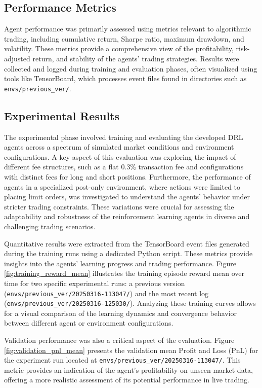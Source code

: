\documentclass{IEEEtran}
\begin{document}
\subsection{Performance Metrics}
Agent performance was primarily assessed using metrics relevant to algorithmic trading, including cumulative return, Sharpe ratio, maximum drawdown, and volatility. These metrics provide a comprehensive view of the profitability, risk-adjusted return, and stability of the agents' trading strategies. Results were collected and logged during training and evaluation phases, often visualized using tools like TensorBoard, which processes event files found in directories such as \texttt{envs/previous\_ver/}.

\subsection{Experimental Results}
The experimental phase involved training and evaluating the developed DRL agents across a spectrum of simulated market conditions and environment configurations. A key aspect of this evaluation was exploring the impact of different fee structures, such as a flat 0.3\% transaction fee and configurations with distinct fees for long and short positions. Furthermore, the performance of agents in a specialized post-only environment, where actions were limited to placing limit orders, was investigated to understand the agents' behavior under stricter trading constraints. These variations were crucial for assessing the adaptability and robustness of the reinforcement learning agents in diverse and challenging trading scenarios.

Quantitative results were extracted from the TensorBoard event files generated during the training runs using a dedicated Python script. These metrics provide insights into the agents' learning progress and trading performance. Figure \ref{fig:training_reward_mean} illustrates the training episode reward mean over time for two specific experimental runs: a previous version (\texttt{envs/previous\_ver/20250316-113047/}) and the most recent log (\texttt{envs/previous\_ver/20250316-125030/}). Analyzing these training curves allows for a visual comparison of the learning dynamics and convergence behavior between different agent or environment configurations.

Validation performance was also a critical aspect of the evaluation. Figure \ref{fig:validation_pnl_mean} presents the validation mean Profit and Loss (PnL) for the experiment run located at \texttt{envs/previous\_ver/20250316-113047/}. This metric provides an indication of the agent's profitability on unseen market data, offering a more realistic assessment of its potential performance in live trading.
\end{document}
